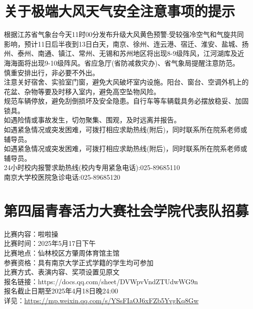 \documentclass[letterpaper, 12pt]{article}
\begin{document}
\begin{multicols}{2}
\section{关于极端大风天气安全注意事项的提示}
根据江苏省气象台今天11时00分发布升级大风黄色预警:受较强冷空气和气旋共同影响，预计11日后半夜到13日白天，南京、徐州、连云港、宿迁、淮安、盐城、扬州、泰州、南通、镇江、常州、无锡和苏州地区将出现8-9级阵风，江河湖库及近海海面将出现9-10级阵风。省应急厅(省防减救灾办)、省气象局提醒注意防范。
\\慎重安排出行，非必要不外出。
\\注意关好宿舍、实验室门窗，避免大风破坏室内设施。阳台、窗台、空调外机上的花盆、杂物等要及时移入室内，避免高空坠物风险。
\\规范车辆停放，避免刮倒损坏及安全隐患。自行车等车辆载具务必摆放稳妥、加固锁具。
\\如遇险情或事故发生，切勿聚集、围观，及时远离并报告。
\\如遇紧急情况或突发困难，可拨打相应求助热线(附后)，同时联系所在院系老师或辅导员。
\\如遇紧急情况或突发困难，可拨打相应求助热线(附后)，同时联系所在院系老师或辅导员。
\\24小时校内报警求助热线(校内专用紧急电话):025-89685110
\\南京大学校医院急诊电话:025-89685120
\section{第四届青春活力大赛社会学院代表队招募}
比赛内容：啦啦操
\\比赛时间：2025年5月17日下午
\\比赛地点：仙林校区方肇周体育馆主馆
\\参赛资格：具有南京大学正式学籍的学生均可参加
\\比赛方式、表演内容、奖项设置见原文
\\报名链接：https://docs.qq.com/sheet/DVWpvVndZTUdwWG9n
\\报名截止日期至2025年4月18日晚24:00
\\详见：\url{https://mp.weixin.qq.com/s/YSsFIaOJ6xFZb5YvgKq8Gw}


\end{multicols}
\end{document}
